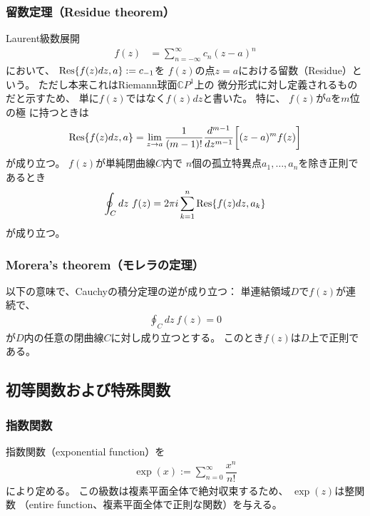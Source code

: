 \subsubsection{留数定理（Residue theorem）}

Laurent級数展開
\begin{align}
    f(z)
    &= \sum_{n=-\infty}^{\infty}
        c_n (z-a)^n
\end{align}
において、
$\Res{f(z)dz, a} := c_{-1}$を
$f(z)$の点$z=a$における留数（Residue）という。
ただし本来これはRiemann球面$\mathbb{C}P^1$上の
微分形式に対し定義されるものだと示すため、
単に$f(z)$ではなく$f(z)dz$と書いた。
特に、
$f(z)$が$a$を$m$位の極
に持つときは
\begin{align}
    \Res{f(z)dz, a}
    =
    \lim_{z \to a}
    \dfrac{1}{(m-1)!}
    \dfrac{d^{m-1}}{dz^{m-1}}
    \bigg[
        (z-a)^m f(z)
    \bigg]
\end{align}
が成り立つ。
$f(z)$が単純閉曲線$C$内で
$n$個の孤立特異点$a_1,\dots,a_n$を除き正則であるとき
\begin{align}
    \oint_C dz\ f(z)
    =
    2 \pi i \sum_{k=1}^n
    \Res{f(z)dz, a_k}
\end{align}
が成り立つ。

\subsubsection{Morera's theorem（モレラの定理）}

以下の意味で、Cauchyの積分定理の逆が成り立つ：
単連結領域$D$で$f(z)$が連続で、
\begin{align}
    \oint_C dz\ f(z) = 0
\end{align}
が$D$内の任意の閉曲線$C$に対し成り立つとする。
このとき$f(z)$は$D$上で正則である。

\newpage
\subsection{初等関数および特殊関数}

\subsubsection{指数関数}

指数関数（exponential function）を
\begin{align}
    \exp(x)
    :=
    \sum_{n=0}^\infty
    \dfrac{x^n}{n!}
\end{align}
により定める。
この級数は複素平面全体で絶対収束するため、
$\exp(z)$は整関数
（entire function、複素平面全体で正則な関数）を与える。

